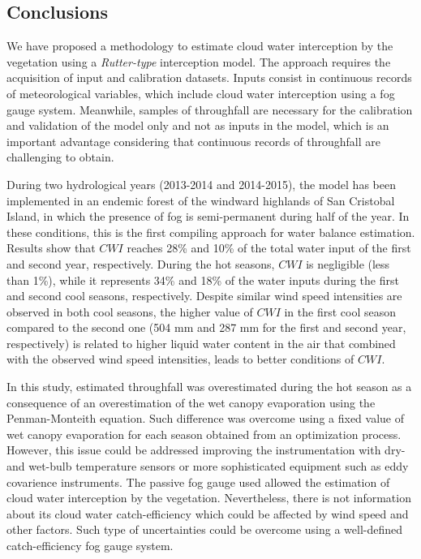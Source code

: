 \documentclass[a4paper,12pt]{article}
\begin{document}
\begin{linenumbers}
\section{Conclusions}
We have proposed a methodology to estimate cloud water interception by the vegetation using a \textit{Rutter-type} interception model. The approach requires the acquisition of input and calibration datasets. Inputs consist in continuous records of meteorological variables, which include cloud water interception using a fog gauge system. Meanwhile, samples of throughfall are necessary for the calibration and validation of the model only and not as inputs in the model, which is an important advantage considering that continuous records of throughfall are challenging to obtain.

During two hydrological years (2013-2014 and 2014-2015), the model has been implemented in an endemic forest of the windward highlands of San Cristobal Island, in which the presence of fog is semi-permanent during half of the year. In these conditions, this is the first compiling approach for water balance estimation. Results show that $CWI$ reaches 28\% and 10\% of the total water input of the first and second year, respectively. During the hot seasons, $CWI$ is negligible (less than 1\%), while it represents 34\% and 18\% of the water inputs during the first and second cool seasons, respectively. Despite similar wind speed intensities are observed in both cool seasons, the higher value of $CWI$ in the first cool season compared to the second one (504 mm and 287 mm for the first and second year, respectively) is related to higher liquid water content in the air that combined with the observed wind speed intensities, leads to better conditions of $CWI$.  

In this study, estimated throughfall was overestimated during the hot season as a consequence of an overestimation of the wet canopy evaporation using the Penman-Monteith equation. Such difference was overcome using a fixed value of wet canopy evaporation for each season obtained from an optimization process. However, this issue could be addressed improving the instrumentation with  dry- and wet-bulb temperature sensors or more sophisticated equipment such as eddy covarience instruments. The passive fog gauge used allowed the estimation of cloud water interception by the vegetation. Nevertheless, there is not information about its cloud water catch-efficiency which could be affected by wind speed and other factors. Such type of uncertainties could be overcome using a well-defined catch-efficiency fog gauge system. 


\end{linenumbers}
\end{document}
